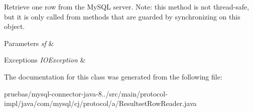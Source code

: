 Retrieve one row from the My\+S\+QL server. Note\+: this method is not thread-\/safe, but it is only called from methods that are guarded by synchronizing on this object.


\begin{DoxyParams}{Parameters}
{\em sf} & \\
\hline
\end{DoxyParams}

\begin{DoxyExceptions}{Exceptions}
{\em I\+O\+Exception} & \\
\hline
\end{DoxyExceptions}


The documentation for this class was generated from the following file\+:\begin{DoxyCompactItemize}
\item 
pruebas/mysql-\/connector-\/java-\/8../src/main/protocol-\/impl/java/com/mysql/cj/protocol/a/Resultset\+Row\+Reader.\+java\end{DoxyCompactItemize}
